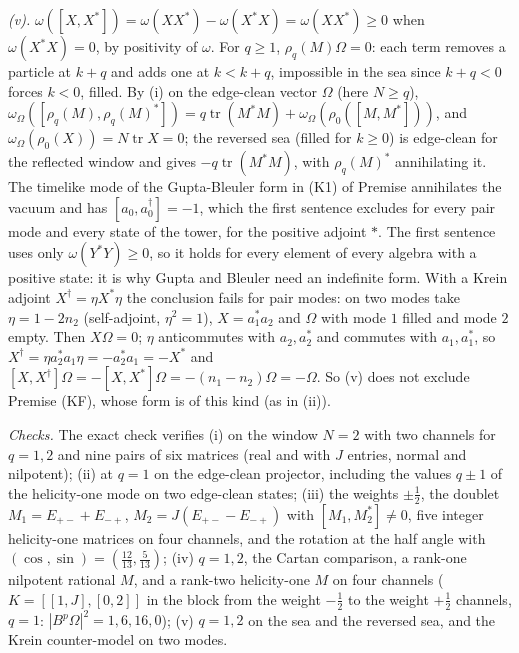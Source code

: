 \emph{(v).} $\omega([X, X^{*}]) = \omega(XX^{*}) - \omega(X^{*}X) = \omega(XX^{*}) \ge 0$ when $\omega(X^{*}X) = 0$, by positivity of $\omega$. For $q \ge 1$, $\rho_{q}(M)\Omega = 0$: each term removes a particle at $k + q$ and adds one at $k < k + q$, impossible in the sea since $k + q < 0$ forces $k < 0$, filled. By (i) on the edge-clean vector $\Omega$ (here $N \ge q$), $\omega_{\Omega}([\rho_{q}(M), \rho_{q}(M)^{*}]) = q\operatorname{tr}(M^{*}M) + \omega_{\Omega}(\rho_{0}([M, M^{*}]))$, and $\omega_{\Omega}(\rho_{0}(X)) = N\operatorname{tr}X = 0$; the reversed sea (filled for $k \ge 0$) is edge-clean for the reflected window and gives $-q\operatorname{tr}(M^{*}M)$, with $\rho_{q}(M)^{*}$ annihilating it. The timelike mode of the Gupta-Bleuler form in (K1) of Premise  annihilates the vacuum and has $[a_{0}, a_{0}^{\dagger}] = -1$, which the first sentence excludes for every pair mode and every state of the tower, for the positive adjoint $*$. The first sentence uses only $\omega(Y^{*}Y) \ge 0$, so it holds for every element of every algebra with a positive state: it is why Gupta and Bleuler need an indefinite form. With a Krein adjoint $X^{\dagger} = \eta X^{*}\eta$ the conclusion fails for pair modes: on two modes take $\eta = 1 - 2n_{2}$ (self-adjoint, $\eta^{2} = 1$), $X = a_{1}^{*}a_{2}$ and $\Omega$ with mode $1$ filled and mode $2$ empty. Then $X\Omega = 0$; $\eta$ anticommutes with $a_{2}, a_{2}^{*}$ and commutes with $a_{1}, a_{1}^{*}$, so $X^{\dagger} = \eta a_{2}^{*}a_{1}\eta = -a_{2}^{*}a_{1} = -X^{*}$ and $[X, X^{\dagger}]\Omega = -[X, X^{*}]\Omega = -(n_{1} - n_{2})\Omega = -\Omega$. So (v) does not exclude Premise (KF), whose form is of this kind (as in (ii)).

\emph{Checks.} The exact check verifies (i) on the window $N = 2$ with two channels for $q = 1, 2$ and nine pairs of six matrices (real and with $J$ entries, normal and nilpotent); (ii) at $q = 1$ on the edge-clean projector, including the values $q \pm 1$ of the helicity-one mode on two edge-clean states; (iii) the weights $\pm\tfrac12$, the doublet $M_{1} = E_{+-} + E_{-+}$, $M_{2} = J(E_{+-} - E_{-+})$ with $[M_{1}, M_{2}^{*}] \ne 0$, five integer helicity-one matrices on four channels, and the rotation at the half angle with $(\cos, \sin) = (\tfrac{12}{13}, \tfrac{5}{13})$; (iv) $q = 1, 2$, the Cartan comparison, a rank-one nilpotent rational $M$, and a rank-two helicity-one $M$ on four channels ($K = [[1, J], [0, 2]]$ in the block from the weight $-\tfrac12$ to the weight $+\tfrac12$ channels, $q = 1$: $|B^{p}\Omega|^{2} = 1, 6, 16, 0$); (v) $q = 1, 2$ on the sea and the reversed sea, and the Krein counter-model on two modes.
